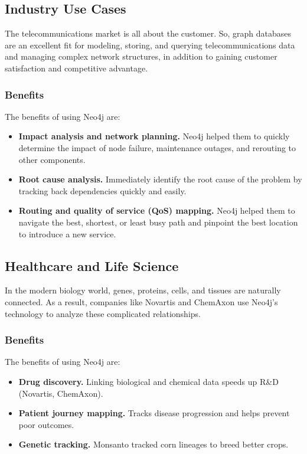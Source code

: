 \documentclass[11pt,a4paper]{article}
\begin{document}
\subsection{Industry Use Cases}

The telecommunications market is all about the customer. So, graph databases are an excellent fit for modeling, storing, and querying telecommunications data and managing complex network structures, in addition to gaining customer satisfaction and competitive advantage.

\subsubsection*{Benefits}

The benefits of using Neo4j are:

\begin{itemize}
  \item \textbf{Impact analysis and network planning.} Neo4j helped them to quickly determine the impact of node failure, maintenance outages, and rerouting to other components.
  \item \textbf{Root cause analysis.} Immediately identify the root cause of the problem by tracking back dependencies quickly and easily.
  \item \textbf{Routing and quality of service (QoS) mapping.} Neo4j helped them to navigate the best, shortest, or least busy path and pinpoint the best location to introduce a new service.
\end{itemize}

\subsection{Healthcare and Life Science}

In the modern biology world, genes, proteins, cells, and tissues are naturally connected. As a result, companies like Novartis and ChemAxon use Neo4j's technology to analyze these complicated relationships.

\subsubsection*{Benefits}

The benefits of using Neo4j are:

\begin{itemize}
  \item \textbf{Drug discovery.} Linking biological and chemical data speeds up R\&D (Novartis, ChemAxon).
  \item \textbf{Patient journey mapping.} Tracks disease progression and helps prevent poor outcomes.
  \item \textbf{Genetic tracking.} Monsanto tracked corn lineages to breed better crops.
\end{itemize}
\end{document}
